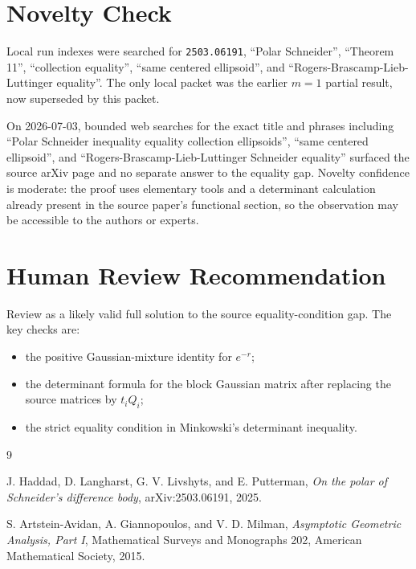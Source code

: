 \documentclass[11pt]{amsart}
\begin{document}
\section*{Novelty Check}

Local run indexes were searched for \texttt{2503.06191}, ``Polar Schneider'',
``Theorem 11'', ``collection equality'', ``same centered ellipsoid'', and
``Rogers-Brascamp-Lieb-Luttinger equality''.  The only local packet was the
earlier \(m=1\) partial result, now superseded by this packet.

On 2026-07-03, bounded web searches for the exact title and phrases including
``Polar Schneider inequality equality collection ellipsoids'', ``same centered
ellipsoid'', and ``Rogers-Brascamp-Lieb-Luttinger Schneider equality'' surfaced
the source arXiv page and no separate answer to the equality gap.  Novelty
confidence is moderate: the proof uses elementary tools and a determinant
calculation already present in the source paper's functional section, so the
observation may be accessible to the authors or experts.

\section*{Human Review Recommendation}

Review as a likely valid full solution to the source equality-condition gap.
The key checks are:

\begin{itemize}
\item the positive Gaussian-mixture identity for \(e^{-r}\);
\item the determinant formula for the block Gaussian matrix after replacing
  the source matrices by \(t_iQ_i\);
\item the strict equality condition in Minkowski's determinant inequality.
\end{itemize}

\begin{thebibliography}{9}

J. Haddad, D. Langharst, G. V. Livshyts, and E. Putterman,
\emph{On the polar of Schneider's difference body},
arXiv:2503.06191, 2025.

S. Artstein-Avidan, A. Giannopoulos, and V. D. Milman,
\emph{Asymptotic Geometric Analysis, Part I},
Mathematical Surveys and Monographs 202,
American Mathematical Society, 2015.

\end{thebibliography}
\end{document}
